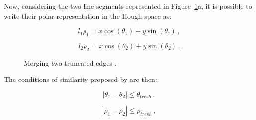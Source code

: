 Now, considering the two line segments represented in Figure~\ref{fig:mergeEdges}a, it is possible to write their polar representation in the Hough space as:

\begin{equation}
  l_1 \rho_1 = x \cos (\theta_1) +  y \sin (\theta_1) \,,
\end{equation}

\begin{equation}
  l_2 \rho_2 = x \cos (\theta_2) +  y \sin (\theta_2) \,.
\end{equation}

\begin{figure}[htbp]
  \centering
  \qquad
  \qquad
  \caption{Merging two truncated edges \cite{Sharma2018}.}
  \label{fig:mergeEdges}
\end{figure}

The conditions of similarity proposed by \cite{Sharma2018} are then:

\begin{equation}
  |\theta_1 - \theta_2| \leqslant \theta_{tresh} \,,
\end{equation}

\begin{equation}
  |\rho_1 - \rho_2| \leqslant \rho_{tresh} \,,
\end{equation}

